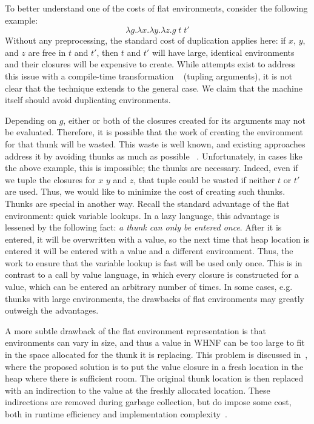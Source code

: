 To better understand one of the costs of flat environments, consider the
following example: $$\lambda g.\lambda x.\lambda y.\lambda z.g
\; t \;t'$$ Without any preprocessing, the standard cost of duplication applies
here: if $x$, $y$, and $z$ are free in $t$ and $t'$, then $t$ and $t'$ will have
large, identical environments and their closures will be expensive to create.
While attempts exist to address this issue with a compile-time transformation
~\cite{peyton1992implementing} (tupling arguments), it is not clear that the
technique extends to the general case. We claim that the machine itself should
avoid duplicating environments.

Depending on $g$, either or both of the closures created for its arguments may
not be evaluated.  Therefore, it is possible that the work of creating the
environment for that thunk will be wasted. This waste is well known, and
existing approaches address it by avoiding thunks as much as possible
~\cite{jonesstg,johnsson1984efficient}. Unfortunately, in cases like the above
example, this is impossible; the thunks are necessary. Indeed, even if we tuple
the closures for $x$ $y$ and $z$, that tuple could be wasted if neither $t$ or
$t'$ are used. Thus, we would like to minimize the cost of creating such thunks.
Thunks are special in another way.  Recall the standard advantage of the flat
environment: quick variable lookups. In a lazy language, this advantage is
lessened by the following fact: \emph{a thunk can only be entered once}. After
it is entered, it will be overwritten with a value, so the next time that heap
location is entered it will be entered with a value and a different environment.
Thus, the work to ensure that the variable lookup is fast will be used only
once. This is in contrast to a call by value language, in which every closure is
constructed for a value, which can be entered an arbitrary number of times. In
some cases, e.g. thunks with large environments, the drawbacks of flat
environments may greatly outweigh the advantages.

A more subtle drawback of the flat environment representation is that
environments can vary in size, and thus a value in WHNF can be too large to fit
in the space allocated for the thunk it is replacing. This problem is discussed
in~\cite{jonesstg}, where the proposed solution is to put the value closure in
a fresh location in the heap where there is sufficient room. The original
thunk location is then replaced with an indirection to the value at the freshly
allocated location. These indirections are removed during garbage collection,
but do impose some cost, both in runtime efficiency and implementation
complexity~\cite{jonesstg}.

